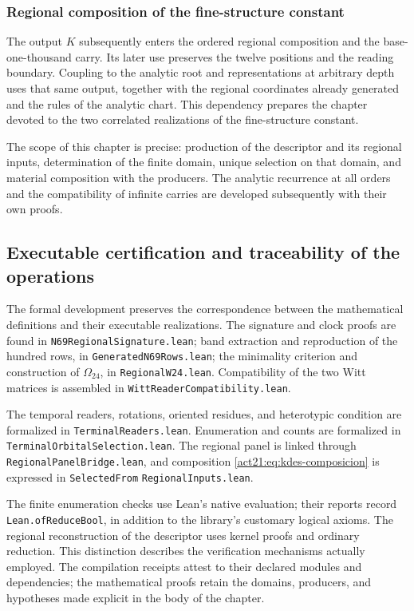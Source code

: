 \subsubsection{Regional composition of the fine-structure constant}

The output $K$ subsequently enters the ordered regional
composition and the base-one-thousand carry. Its later use preserves the
twelve positions and the reading boundary. Coupling to the analytic
root and representations at arbitrary depth uses that
same output, together with the regional coordinates already generated and the
rules of the analytic chart. This dependency prepares the chapter
devoted to the two correlated realizations of the fine-structure
constant.

The scope of this chapter is precise: production of the descriptor and
its regional inputs, determination of the finite domain,
unique selection on that domain, and material composition with the
producers. The analytic recurrence at all orders and the
compatibility of infinite carries are developed subsequently with their
own proofs.

\subsection{Executable certification and traceability of the operations}

The formal development preserves the correspondence between the
mathematical definitions and their executable realizations. The signature
and clock proofs are found in
\texttt{N69RegionalSignature.lean}; band extraction and
reproduction of the hundred rows, in
\texttt{GeneratedN69Rows.lean}; the minimality criterion and construction
of $\Omega_{24}$, in \texttt{RegionalW24.lean}. Compatibility of
the two Witt matrices is assembled in
\texttt{WittReaderCompatibility.lean}.

The temporal readers, rotations, oriented residues, and
heterotypic condition are formalized in
\texttt{TerminalReaders.lean}. Enumeration and counts are
formalized in \texttt{Terminal}\allowbreak\texttt{Orbital}\allowbreak\texttt{Selection.lean}. The regional
panel is linked through \texttt{Regional}\allowbreak\texttt{Panel}\allowbreak\texttt{Bridge.lean}, and
composition \eqref{act21:eq:kdes-composicion} is expressed in
\texttt{Selected}\allowbreak\texttt{From}\allowbreak%
\texttt{Regional}\allowbreak\texttt{Inputs.lean}.

The finite enumeration checks use Lean's native
evaluation; their reports record \texttt{Lean.}\allowbreak\texttt{ofReduceBool}, in addition
to the library's customary logical axioms. The regional reconstruction
of the descriptor uses kernel proofs and ordinary
reduction. This distinction describes the verification mechanisms
actually employed. The compilation receipts attest to their declared modules
and dependencies; the mathematical proofs retain the
domains, producers, and hypotheses made explicit in the body
of the chapter.

